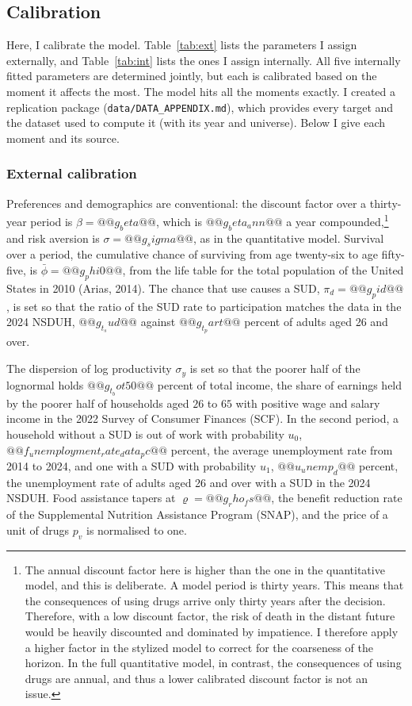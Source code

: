 \documentclass[10pt]{article}
\begin{document}
\subsection{Calibration}\label{sec:cal}

  Here, I calibrate the model. Table~\ref{tab:ext} lists the parameters I assign externally, and Table~\ref{tab:int} lists the ones I assign internally. All five internally fitted parameters are determined jointly, but each is calibrated based on the moment it affects the most. The model hits all the moments exactly. I created a replication package (\texttt{data/DATA\_APPENDIX.md}), which provides every target and the dataset used to compute it (with its year and universe). Below I give each moment and its source.

\subsubsection{External calibration}

Preferences and demographics are conventional: the discount factor over a
thirty-year period is $\beta=@@g_beta@@$, which is $@@g_beta_ann@@$ a year compounded,\footnote{The annual discount factor here is higher than the one in the
quantitative model, and this is deliberate.    A model period is thirty years. This means that the consequences of using drugs arrive only thirty years after the decision. Therefore, with a low discount factor, the risk of death in the distant future would be heavily discounted and dominated by impatience. I therefore apply a higher factor in the stylized model to correct for the coarseness of the horizon. In the full quantitative model, in contrast, the consequences of using drugs are annual, and thus a lower calibrated discount factor is not an issue.} and risk aversion is
$\sigma=@@g_sigma@@$, as in the quantitative model. Survival over a period, the cumulative chance of surviving from age twenty-six to age fifty-five, is
$\bar\phi = @@g_phi0@@$, from the life table for the total population of the United States in 2010
(Arias, 2014). The chance that use causes a SUD, $\pi_d=@@g_pid@@$, is set so that the ratio of the SUD rate to participation matches the data in the 2024 NSDUH, $@@g_t_sud@@$ against $@@g_t_part@@$ percent of adults aged 26 and over.

The dispersion of log productivity $\sigma_y$ is set so that the poorer half of the lognormal holds $@@g_t_bot50@@$ percent of total income, the share of earnings held by the poorer half of households aged $26$ to $65$ with positive wage and salary income in the 2022 Survey of Consumer Finances (SCF). In the second period, a household without a SUD is out of work with probability $u_0$, $@@f_unemployment_rate_data_pc@@$ percent, the average unemployment rate from 2014 to 2024, and one with a SUD with probability $u_1$, $@@u_unemp_d@@$ percent, the unemployment rate of adults aged 26 and over with a SUD in the 2024 NSDUH. Food assistance tapers at $\varrho=@@g_rho_fs@@$, the benefit reduction rate of the Supplemental Nutrition Assistance Program (SNAP), and the price of a unit of drugs $p_v$ is normalised to one.
\end{document}
